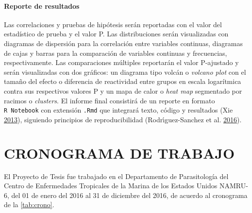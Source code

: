 \documentclass[
  a4paper]{article}
\let\oldparagraph\paragraph
\renewcommand{\paragraph}[1]{\oldparagraph{#1}\mbox{}}
\begin{document}
\hypertarget{reporte-de-resultados}{%
\paragraph{Reporte de resultados}\label{reporte-de-resultados}}

Las correlaciones y pruebas de hipótesis serán reportadas con el valor
del estadístico de prueba y el valor P. Las distribuciones serán
visualizadas con diagramas de dispersión para la correlación entre
variables continuas, diagramas de cajas y barras para la comparación de
variables continuas y frecuencias, respectivamente. Las comparaciones
múltiples reportarán el valor P-ajustado y serán visualizadas con dos
gráficos: un diagrama tipo volcán o \emph{volcano plot} con el tamaño
del efecto o diferencia de reactividad entre grupos en escala
logarítmica contra sus respectivos valores P y un mapa de calor o
\emph{heat map} segmentado por racimos o \emph{clusters}. El informe
final consistirá de un reporte en formato \texttt{R\ Notebook} con
extensión \texttt{.Rmd} que integrará texto, código y resultados (Xie
\protect\hyperlink{ref-knitr}{2013}), siguiendo principios de
reproducibilidad (Rodrı́guez-Sanchez et al.
\protect\hyperlink{ref-CienciaReproducible2016}{2016}).

\hypertarget{cronograma-de-trabajo}{%
\section{CRONOGRAMA DE TRABAJO}\label{cronograma-de-trabajo}}

El Proyecto de Tesis fue trabajado en el Departamento de Parasitología
del Centro de Enfermedades Tropicales de la Marina de los Estados Unidos
NAMRU-6, del 01 de enero del 2016 al 31 de diciembre del 2016, de
acuerdo al cronograma de la \autoref{tab:crono}.
\end{document}
